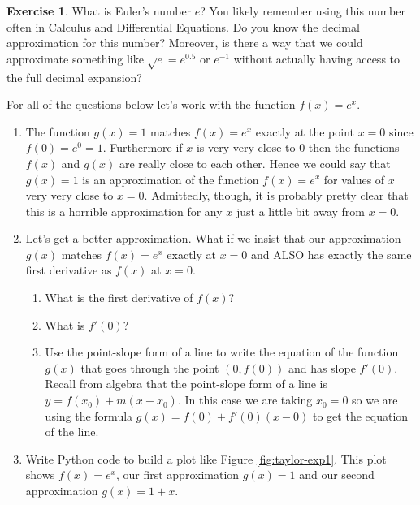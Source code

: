 \documentclass[
]{book}
\providecommand{\tightlist}{%
  \setlength{\itemsep}{0pt}\setlength{\parskip}{0pt}}
\theoremstyle{definition}
\theoremstyle{definition}
\theoremstyle{definition}
\newtheorem{exercise}{Exercise}[chapter]
\theoremstyle{remark}
\begin{document}
\begin{exercise}
\protect\hypertarget{exr:unnamed-chunk-32}{}{\label{exr:unnamed-chunk-32} }What is Euler's number \(e\)? You likely remember using this number often in Calculus and Differential Equations. Do you know the decimal approximation for this number? Moreover, is there a way that we could approximate something like \(\sqrt{e} = e^{0.5}\) or \(e^{-1}\) without actually having access to the full decimal expansion?

For all of the questions below let's work with the function \(f(x) = e^x\).

\begin{enumerate}
\def\labelenumi{\alph{enumi}.}
\item
  The function \(g(x) = 1\) matches \(f(x) = e^x\) exactly at the point \(x=0\) since \(f(0) = e^0 = 1\). Furthermore if \(x\) is very very close to \(0\) then the functions \(f(x)\) and \(g(x)\) are really close to each other. Hence we could say that \(g(x) = 1\) is an approximation of the function \(f(x) = e^x\) for values of \(x\) very very close to \(x=0\). Admittedly, though, it is probably pretty clear that this is a horrible approximation for any \(x\) just a little bit away from \(x=0\).
\item
  Let's get a better approximation. What if we insist that our approximation \(g(x)\) matches \(f(x) = e^x\) exactly at \(x=0\) and ALSO has exactly the same first derivative as \(f(x)\) at \(x=0\).

  \begin{enumerate}
  \def\labelenumii{\roman{enumii}.}
  \tightlist
  \item
    What is the first derivative of \(f(x)\)?
  \item
    What is \(f'(0)\)?
  \item
    Use the point-slope form of a line to write the equation of the function \(g(x)\) that goes through the point \((0,f(0))\) and has slope \(f'(0)\).
    Recall from algebra that the point-slope form of a line is \(y = f(x_0) + m(x-x_0).\) In this case we are taking \(x_0 = 0\) so we are using the formula \(g(x) = f(0) + f'(0) (x-0)\) to get the equation of the line.
  \end{enumerate}
\item
  Write Python code to build a plot like Figure \ref{fig:taylor-exp1}. This plot shows \(f(x) = e^x\), our first approximation \(g(x) = 1\) and our second approximation \(g(x) = 1+x\).\\
\end{enumerate}
\end{exercise}
\end{document}
